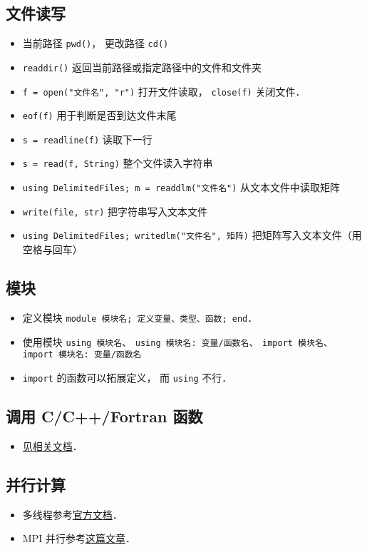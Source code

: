 \subsection{文件读写}
\begin{itemize}
\item 当前路径 \verb|pwd()|， 更改路径 \verb|cd()|
\item \verb|readdir()| 返回当前路径或指定路径中的文件和文件夹
\item \verb|f = open("文件名", "r")| 打开文件读取， \verb|close(f)| 关闭文件．
\item \verb|eof(f)| 用于判断是否到达文件末尾
\item \verb|s = readline(f)| 读取下一行
\item \verb|s = read(f, String)| 整个文件读入字符串
\item \verb|using DelimitedFiles; m = readdlm("文件名")| 从文本文件中读取矩阵
\item \verb|write(file, str)| 把字符串写入文本文件
\item \verb|using DelimitedFiles; writedlm("文件名", 矩阵)| 把矩阵写入文本文件（用空格与回车）
\end{itemize}

\subsection{模块}
\begin{itemize}
\item 定义模块 \verb|module 模块名; 定义变量、类型、函数; end|．
\item 使用模块 \verb|using 模块名|、 \verb|using 模块名: 变量/函数名|、 \verb|import 模块名|、 \verb|import 模块名: 变量/函数名|
\item \verb|import| 的函数可以拓展定义， 而 \verb|using| 不行．
\end{itemize}

\subsection{调用 C/C++/Fortran 函数}
\begin{itemize}
\item \href{https://docs.julialang.org/en/v1/manual/calling-c-and-fortran-code/}{见相关文档}．
\end{itemize}

\subsection{并行计算}
\begin{itemize}
\item 多线程参考\href{https://docs.julialang.org/en/v1/manual/multi-threading/}{官方文档}．
\item MPI 并行参考\href{http://www.claudiobellei.com/2018/09/30/julia-mpi/}{这篇文章}．
\end{itemize}
